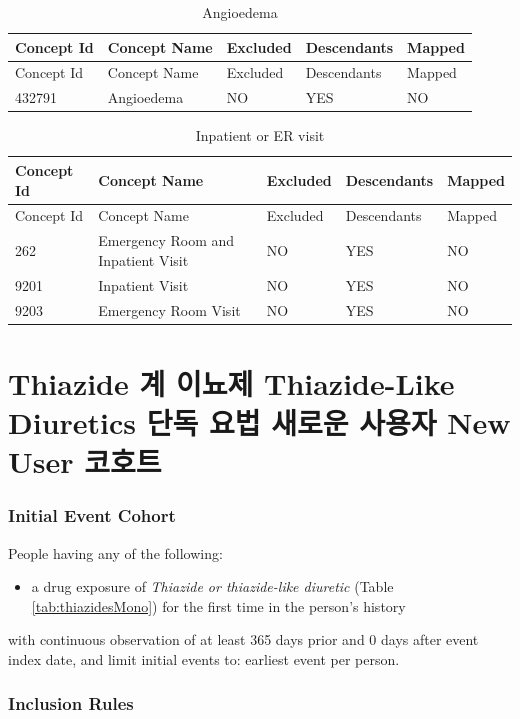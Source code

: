 \documentclass[10.5pt]{book}
\providecommand{\tightlist}{%
  \setlength{\itemsep}{0pt}\setlength{\parskip}{0pt}}
\theoremstyle{definition}
\theoremstyle{definition}
\theoremstyle{definition}
\theoremstyle{remark}
\begin{document}
\begin{longtable}[]{@{}lllll@{}}
\caption{\label{tab:angioedema} Angioedema}\tabularnewline
\toprule
Concept Id & Concept Name & Excluded & Descendants &
Mapped\tabularnewline
\midrule
\endfirsthead
\toprule
Concept Id & Concept Name & Excluded & Descendants &
Mapped\tabularnewline
\midrule
\endhead
432791 & Angioedema & NO & YES & NO\tabularnewline
\bottomrule
\end{longtable}

\begin{longtable}[]{@{}lllll@{}}
\caption{\label{tab:inpatientOrEr} Inpatient or ER visit}\tabularnewline
\toprule
Concept Id & Concept Name & Excluded & Descendants &
Mapped\tabularnewline
\midrule
\endfirsthead
\toprule
Concept Id & Concept Name & Excluded & Descendants &
Mapped\tabularnewline
\midrule
\endhead
262 & Emergency Room and Inpatient Visit & NO & YES & NO\tabularnewline
9201 & Inpatient Visit & NO & YES & NO\tabularnewline
9203 & Emergency Room Visit & NO & YES & NO\tabularnewline
\bottomrule
\end{longtable}

\section{Thiazide 계 이뇨제 Thiazide-Like Diuretics 단독 요법 새로운
사용자 New User 코호트}\label{ThiazidesMono}

\subsubsection*{Initial Event Cohort}\label{initial-event-cohort-4}

People having any of the following:

\begin{itemize}
\tightlist
\item
  a drug exposure of \emph{Thiazide or thiazide-like diuretic} (Table
  \ref{tab:thiazidesMono}) for the first time in the person's history
\end{itemize}

with continuous observation of at least 365 days prior and 0 days after
event index date, and limit initial events to: earliest event per
person.

\subsubsection*{Inclusion Rules}\label{inclusion-rules-1}
\end{document}
